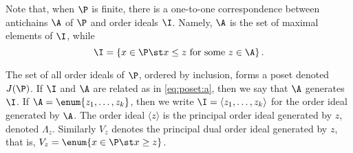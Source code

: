 Note that, when $\P$ is finite, there is a one-to-one correspondence between
antichains $\A$ of $\P$ and order ideals $\I$. Namely, $\A$ is the set of maximal
elements of $\I$, while
\begin{equation}
\label{eq:poset:a}
\I = \left\{{x \in \P \st x \le z ~\text{for some}~ z \in \A}\right\}.
\end{equation}

The set of all order ideals of $\P$, ordered by inclusion, forms a poset denoted
$J(\P)$. If $\I$ and $\A$ are related as in \ref{eq:poset:a}, then we say that $\A$
generates $\I$. If $\A = \enum{z_1 , \ldots , z_k}$, then we
write $\I = \langle z_1 , \ldots , z_k \rangle$ for the order ideal generated by
$\A$. The order ideal $\langle z \rangle$ is the principal order ideal
generated by $z$, denoted $\Lambda_z$. Similarly $V_z$ denotes the principal
dual order ideal generated by $z$, that is, $V_z = \enum{x \in \P \st x \ge
z}$.

